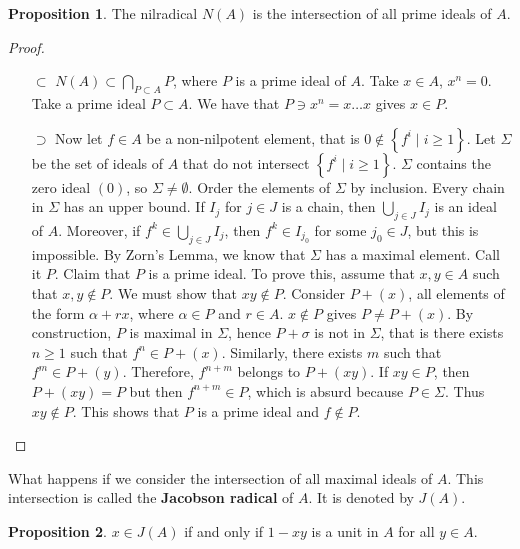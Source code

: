 \documentclass{article}
\newcommand{\rb}[1]{\left( #1 \right)}
\newcommand{\cb}[1]{\left\{ #1 \right\}}
\theoremstyle{definition}\newtheorem{definition}{Definition}[section]
\theoremstyle{definition}\newtheorem{remark}[definition]{Remark}
\theoremstyle{definition}\newtheorem*{example}{Example}
\theoremstyle{definition}\newtheorem*{note}{Note}
\newtheorem{proposition}[definition]{Proposition}
\begin{document}
\begin{proposition}
The nilradical $ N\rb{A} $ is the intersection of all prime ideals of $ A $.
\end{proposition}

\begin{proof}
\hfill
\begin{itemize}
\item[$ \subset $] $ N\rb{A} \subset \bigcap_{P \subset A} P $, where $ P $ is a prime ideal of $ A $. Take $ x \in A $, $ x^n = 0 $. Take a prime ideal $ P \subset A $. We have that $ P \ni x^n = x \dots x $ gives $ x \in P $.
\item[$ \supset $] Now let $ f \in A $ be a non-nilpotent element, that is $ 0 \notin \cb{f^i \mid i \ge 1} $. Let $ \Sigma $ be the set of ideals of $ A $ that do not intersect $ \cb{f^i \mid i \ge 1} $. $ \Sigma $ contains the zero ideal $ \rb{0} $, so $ \Sigma \ne \emptyset $. Order the elements of $ \Sigma $ by inclusion. Every chain in $ \Sigma $ has an upper bound. If $ I_j $ for $ j \in J $ is a chain, then $ \bigcup_{j \in J} I_j $ is an ideal of $ A $. Moreover, if $ f^k \in \bigcup_{j \in J} I_j $, then $ f^k \in I_{j_0} $ for some $ j_0 \in J $, but this is impossible. By Zorn's Lemma, we know that $ \Sigma $ has a maximal element. Call it $ P $. Claim that $ P $ is a prime ideal. To prove this, assume that $ x, y \in A $ such that $ x, y \notin P $. We must show that $ xy \notin P $. Consider $ P + \rb{x} $, all elements of the form $ \alpha + rx $, where $ \alpha \in P $ and $ r \in A $. $ x \notin P $ gives $ P \ne P + \rb{x} $. By construction, $ P $ is maximal in $ \Sigma $, hence $ P + \sigma $ is not in $ \Sigma $, that is there exists $ n \ge 1 $ such that $ f^n \in P + \rb{x} $. Similarly, there exists $ m $ such that $ f^m \in P + \rb{y} $. Therefore, $ f^{n + m} $ belongs to $ P + \rb{xy} $. If $ xy \in P $, then $ P + \rb{xy} = P $ but then $ f^{n + m} \in P $, which is absurd because $ P \in \Sigma $. Thus $ xy \notin P $. This shows that $ P $ is a prime ideal and $ f \notin P $.
\end{itemize}
\end{proof}

What happens if we consider the intersection of all maximal ideals of $ A $. This intersection is called the \textbf{Jacobson radical} of $ A $. It is denoted by $ J\rb{A} $.

\begin{proposition}
\label{prop:5.3}
$ x \in J\rb{A} $ if and only if $ 1 - xy $ is a unit in $ A $ for all $ y \in A $.
\end{proposition}
\end{document}
